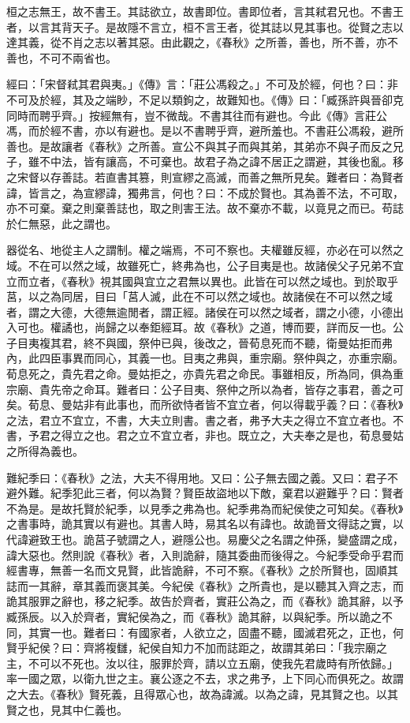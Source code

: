 桓之志無王，故不書王。其誌欲立，故書即位。書即位者，言其弒君兄也。不書王者，以言其背天子。是故隱不言立，桓不言王者，從其誌以見其事也。從賢之志以達其義，從不肖之志以著其惡。由此觀之，《春秋》之所善，善也，所不善，亦不善也，不可不兩省也。

經曰：「宋督弒其君與夷。」《傳》言：「莊公馮殺之。」不可及於經，何也？曰：非不可及於經，其及之端眇，不足以類鉤之，故難知也。《傳》曰：「臧孫許與晉卻克同時而聘乎齊。」按經無有，豈不微哉。不書其往而有避也。今此《傳》言莊公馮，而於經不書，亦以有避也。是以不書聘乎齊，避所羞也。不書莊公馮殺，避所善也。是故讓者《春秋》之所善。宣公不與其子而與其弟，其弟亦不與子而反之兄子，雖不中法，皆有讓高，不可棄也。故君子為之諱不居正之謂避，其後也亂。移之宋督以存善誌。若直書其篡，則宣繆之高滅，而善之無所見矣。難者曰：為賢者諱，皆言之，為宣繆諱，獨弗言，何也？曰：不成於賢也。其為善不法，不可取，亦不可棄。棄之則棄善誌也，取之則害王法。故不棄亦不載，以竟見之而已。苟誌於仁無惡，此之謂也。


器從名、地從主人之謂制。權之端焉，不可不察也。夫權雖反經，亦必在可以然之域。不在可以然之域，故雖死亡，終弗為也，公子目夷是也。故諸侯父子兄弟不宜立而立者，《春秋》視其國與宜立之君無以異也。此皆在可以然之域也。到於取乎莒，以之為同居，目曰「莒人滅，此在不可以然之域也。故諸侯在不可以然之域者，謂之大德，大德無逾閒者，謂正經。諸侯在可以然之域者，謂之小德，小德出入可也。權譎也，尚歸之以奉鉅經耳。故《春秋》之道，博而要，詳而反一也。公子目夷複其君，終不與國，祭仲已與，後改之，晉荀息死而不聽，衛曼姑拒而弗內，此四臣事異而同心，其義一也。目夷之弗與，重宗廟。祭仲與之，亦重宗廟。荀息死之，貴先君之命。曼姑拒之，亦貴先君之命民。事雖相反，所為同，俱為重宗廟、貴先帝之命耳。難者曰：公子目夷、祭仲之所以為者，皆存之事君，善之可矣。荀息、曼姑非有此事也，而所欲恃者皆不宜立者，何以得載乎義？曰：《春秋》之法，君立不宜立，不書，大夫立則書。書之者，弗予大夫之得立不宜立者也。不書，予君之得立之也。君之立不宜立者，非也。既立之，大夫奉之是也，荀息曼姑之所得為義也。


難紀季曰：《春秋》之法，大夫不得用地。又曰：公子無去國之義。又曰：君子不避外難。紀季犯此三者，何以為賢？賢臣故盜地以下敵，棄君以避難乎？曰：賢者不為是。是故托賢於紀季，以見季之弗為也。紀季弗為而紀侯使之可知矣。《春秋》之書事時，詭其實以有避也。其書人時，易其名以有諱也。故詭晉文得誌之實，以代諱避致王也。詭莒子號謂之人，避隱公也。易慶父之名謂之仲孫，變盛謂之成，諱大惡也。然則說《春秋》者，入則詭辭，隨其委曲而後得之。今紀季受命乎君而經書專，無善一名而文見賢，此皆詭辭，不可不察。《春秋》之於所賢也，固順其誌而一其辭，章其義而褒其美。今紀侯《春秋》之所貴也，是以聽其入齊之志，而詭其服罪之辭也，移之紀季。故告於齊者，實莊公為之，而《春秋》詭其辭，以予臧孫辰。以入於齊者，實紀侯為之，而《春秋》詭其辭，以與紀季。所以詭之不同，其實一也。難者曰：有國家者，人欲立之，固盡不聽，國滅君死之，正也，何賢乎紀侯？曰：齊將複讎，紀侯自知力不加而誌距之，故謂其弟曰：「我宗廟之主，不可以不死也。汝以往，服罪於齊，請以立五廟，使我先君歲時有所依歸。」率一國之眾，以衛九世之主。襄公逐之不去，求之弗予，上下同心而俱死之。故謂之大去。《春秋》賢死義，且得眾心也，故為諱滅。以為之諱，見其賢之也。以其賢之也，見其中仁義也。




